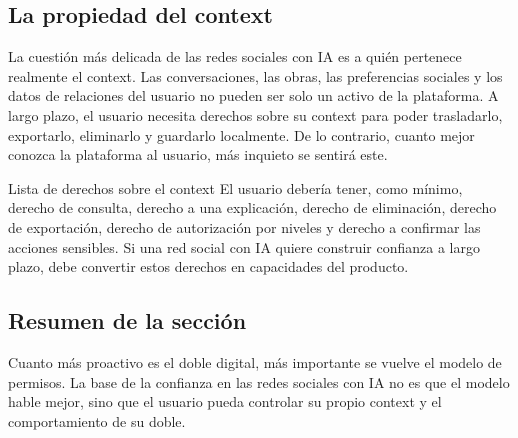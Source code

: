 \subsection{La propiedad del context}

La cuestión más delicada de las redes sociales con IA es a quién pertenece realmente el context. Las conversaciones, las obras, las preferencias sociales y los datos de relaciones del usuario no pueden ser solo un activo de la plataforma. A largo plazo, el usuario necesita derechos sobre su context para poder trasladarlo, exportarlo, eliminarlo y guardarlo localmente. De lo contrario, cuanto mejor conozca la plataforma al usuario, más inquieto se sentirá este.

\begin{importantbox}{Lista de derechos sobre el context}
El usuario debería tener, como mínimo, derecho de consulta, derecho a una explicación, derecho de eliminación, derecho de exportación, derecho de autorización por niveles y derecho a confirmar las acciones sensibles. Si una red social con IA quiere construir confianza a largo plazo, debe convertir estos derechos en capacidades del producto.
\end{importantbox}

\subsection{Resumen de la sección}

Cuanto más proactivo es el doble digital, más importante se vuelve el modelo de permisos. La base de la confianza en las redes sociales con IA no es que el modelo hable mejor, sino que el usuario pueda controlar su propio context y el comportamiento de su doble.

